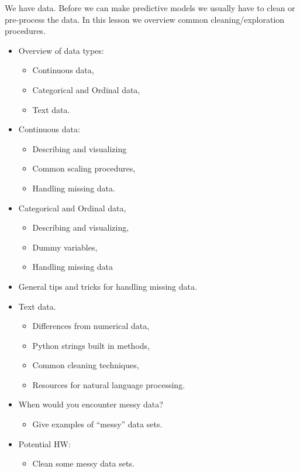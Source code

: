 \documentclass[12pt]{article}
\begin{document}
	\noindent
	We have data. Before we can make predictive models we usually have to clean or pre-process the data. In this lesson we overview common cleaning/exploration procedures.
	\begin{itemize}
		\item Overview of data types:
			\begin{itemize}
				\item Continuous data,
				\item Categorical and Ordinal data,
				\item Text data.
			\end{itemize}
		\item Continuous data:
			\begin{itemize}
				\item Describing and visualizing
				\item Common scaling procedures,
				\item Handling missing data.
			\end{itemize}
		\item Categorical and Ordinal data,
			\begin{itemize}
				\item Describing and visualizing,
				\item Dummy variables,
				\item Handling missing data
			\end{itemize}
		\item General tips and tricks for handling missing data.
		\item Text data.
			\begin{itemize}
				\item Differences from numerical data,
				\item Python strings built in methods,
				\item Common cleaning techniques,
				\item Resources for natural language processing.
			\end{itemize}
		\item When would you encounter messy data?
			\begin{itemize}
				\item Give examples of ``messy'' data sets.
			\end{itemize}
		\item Potential HW:
			\begin{itemize}
				\item Clean some messy data sets.
			\end{itemize}
	\end{itemize}
	
\end{document}
